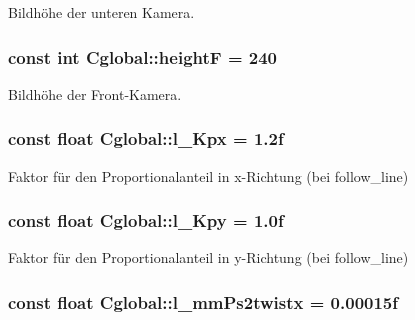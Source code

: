 Bildhöhe der unteren Kamera. 

\hypertarget{class_cglobal_a601f81a0ed28e4e0ca387134ba76738e}{
\subsubsection[{heightF}]{\setlength{\rightskip}{0pt plus 5cm}const int {\bf Cglobal::heightF} = 240}}
\label{class_cglobal_a601f81a0ed28e4e0ca387134ba76738e}


Bildhöhe der Front-\/Kamera. 

\hypertarget{class_cglobal_a6c5a5a9fb3c2da5264622c738b326245}{
\subsubsection[{l\_\-Kpx}]{\setlength{\rightskip}{0pt plus 5cm}const float {\bf Cglobal::l\_\-Kpx} = 1.2f}}
\label{class_cglobal_a6c5a5a9fb3c2da5264622c738b326245}


Faktor für den Proportionalanteil in x-\/Richtung (bei follow\_\-line) 

\hypertarget{class_cglobal_a458383235afe73b333a22a5edcc3eed6}{
\subsubsection[{l\_\-Kpy}]{\setlength{\rightskip}{0pt plus 5cm}const float {\bf Cglobal::l\_\-Kpy} = 1.0f}}
\label{class_cglobal_a458383235afe73b333a22a5edcc3eed6}


Faktor für den Proportionalanteil in y-\/Richtung (bei follow\_\-line) 

\hypertarget{class_cglobal_a7440e55e4a63e1c926c582a36a4d6bd7}{
\subsubsection[{l\_\-mmPs2twistx}]{\setlength{\rightskip}{0pt plus 5cm}const float {\bf Cglobal::l\_\-mmPs2twistx} = 0.00015f}}
\label{class_cglobal_a7440e55e4a63e1c926c582a36a4d6bd7}


